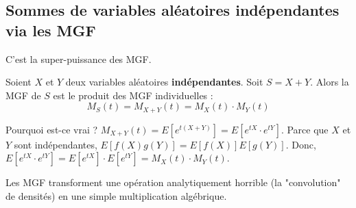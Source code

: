 \subsection{Sommes de variables aléatoires indépendantes via les MGF}

C'est la super-puissance des MGF.

\begin{theorembox}
Soient $X$ et $Y$ deux variables aléatoires \textbf{indépendantes}. Soit $S = X + Y$. Alors la MGF de $S$ est le produit des MGF individuelles :
$$ M_S(t) = M_{X+Y}(t) = M_X(t) \cdot M_Y(t) $$
\end{theorembox}

\begin{intuitionbox}
Pourquoi est-ce vrai ? $M_{X+Y}(t) = E[e^{t(X+Y)}] = E[e^{tX} \cdot e^{tY}]$.
Parce que $X$ et $Y$ sont indépendantes, $E[f(X)g(Y)] = E[f(X)]E[g(Y)]$.
Donc, $E[e^{tX} \cdot e^{tY}] = E[e^{tX}] \cdot E[e^{tY}] = M_X(t) \cdot M_Y(t)$.

Les MGF transforment une opération analytiquement horrible (la "convolution" de densités) en une simple multiplication algébrique.
\end{intuitionbox}

